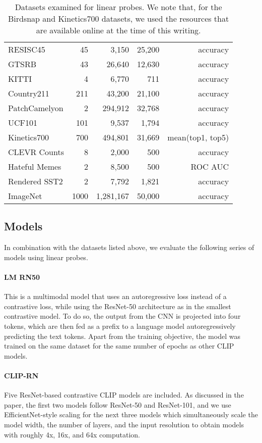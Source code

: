 \documentclass{article}
\begin{document}
\begin{table*}[t]
\begin{tabular}{lrrrr}
RESISC45 & 45 & 3,150 & 25,200 & accuracy \\
GTSRB & 43 & 26,640 & 12,630 & accuracy \\
KITTI & 4 & 6,770 & 711 & accuracy \\
Country211 & 211 & 43,200 & 21,100 & accuracy \\
PatchCamelyon & 2 & 294,912 & 32,768 & accuracy \\
UCF101 & 101 & 9,537 & 1,794 & accuracy \\
Kinetics700 & 700 & 494,801 & 31,669 & mean(top1, top5) \\
CLEVR Counts & 8 & 2,000 & 500 & accuracy \\
Hateful Memes & 2 & 8,500 & 500 & ROC AUC \\
Rendered SST2 & 2 & 7,792 & 1,821 & accuracy \\
ImageNet & 1000 & 1,281,167 & 50,000 & accuracy \\
\bottomrule
\end{tabular}
\caption{Datasets examined for linear probes. We note that, for the Birdsnap and Kinetics700 datasets, we used the resources that are available online at the time of this writing.}
\label{dataset_table}
\end{table*}

\subsection{Models}

In combination with the datasets listed above, we evaluate the following series of models using linear probes.

\paragraph{LM RN50} This is a multimodal model that uses an autoregressive loss instead of a contrastive loss, while using the ResNet-50 architecture as in the smallest contrastive model. To do so, the output from the CNN is projected into four tokens, which are then fed as a prefix to a language model autoregressively predicting the text tokens. Apart from the training objective, the model was trained on the same dataset for the same number of epochs as other CLIP models.
\paragraph{CLIP-RN} Five ResNet-based contrastive CLIP models are included. As discussed in the paper, the first two models follow ResNet-50 and ResNet-101, and we use EfficientNet-style \cite{tan2019efficientnet} scaling for the next three models which simultaneously scale the model width, the number of layers, and the input resolution to obtain models with roughly 4x, 16x, and 64x computation.
\end{document}
